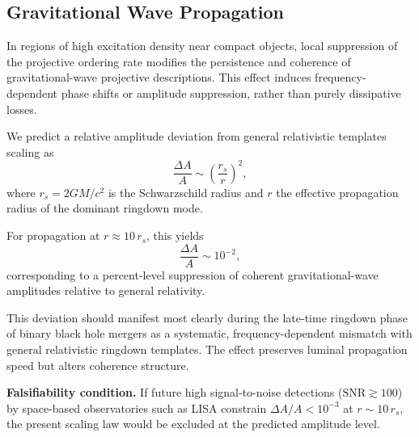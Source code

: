 \subsection{Gravitational Wave Propagation}
  \label{subsec:gravitational-wave-propagation}

  In regions of high excitation density near compact objects, local
  suppression of the projective ordering rate modifies the persistence and coherence
  of gravitational-wave projective descriptions.
  This effect induces frequency-dependent phase shifts or amplitude
  suppression, rather than purely dissipative losses.

  We predict a relative amplitude deviation from general relativistic
  templates scaling as
  \[
    \frac{\Delta A}{A}
    \sim \left(\frac{r_s}{r}\right)^2 ,
  \]
  where $r_s = 2GM/c^2$ is the Schwarzschild radius and $r$ the effective
  propagation radius of the dominant ringdown mode.

  For propagation at $r \approx 10\,r_s$, this yields
  \[
    \frac{\Delta A}{A} \sim 10^{-2} ,
  \]
  corresponding to a percent-level suppression of coherent gravitational-wave
  amplitudes relative to general relativity.

  This deviation should manifest most clearly during the late-time
  ringdown phase of binary black hole mergers as a systematic,
  frequency-dependent mismatch with general relativistic ringdown templates.
  The effect preserves luminal propagation speed but alters coherence
  structure.

  \textbf{Falsifiability condition.}
  If future high signal-to-noise detections ($\mathrm{SNR} \gtrsim 100$)
  by space-based observatories such as LISA constrain
  $\Delta A/A < 10^{-3}$ at $r \sim 10\,r_s$,
  the present scaling law would be excluded at the predicted amplitude level.
